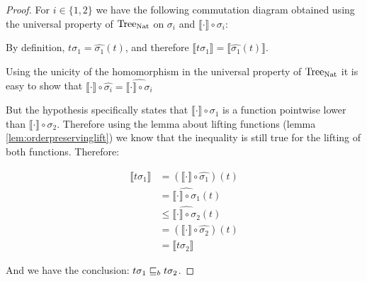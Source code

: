 \begin{ensps}
\begin{proof}
    For $i \in \{ 1, 2\}$ we have the following commutation diagram 
    obtained using the universal property of $\textnormal{Tree}_{\textnormal{Nat}}$ on 
    $\sigma_i$ and $\llbracket \cdot \rrbracket \circ \sigma_i$:

    \begin{center}
    \end{center}

    By definition, $t \sigma_1 = \hat{\sigma_1} (t)$, 
    and therefore $\llbracket t \sigma_1 \rrbracket = \llbracket \hat{\sigma_1}
    (t) \rrbracket$.

    Using the unicity of the homomorphism in the universal property of
    $\textnormal{Tree}_{\textnormal{Nat}}$ it is easy to show that $\llbracket \cdot \rrbracket 
    \circ \hat{\sigma_i} = \widehat{ \llbracket \cdot \rrbracket \circ \sigma_i
    }$

    But the hypothesis specifically states that $\llbracket \cdot \rrbracket 
    \circ \sigma_1$ is a function pointwise lower than $\llbracket \cdot
    \rrbracket \circ \sigma_2$. Therefore using the lemma about 
    lifting functions (lemma \ref{lem:orderpreservinglift})
    we know that the inequality is still true for the lifting 
    of both functions. Therefore:

    \begin{align*}
        \llbracket t \sigma_1 \rrbracket &= 
        (\llbracket \cdot \rrbracket \circ \hat{\sigma_1}) (t) \\
        &= \widehat{ \llbracket \cdot \rrbracket \circ \sigma_1} (t) \\
        &\leq \widehat{ \llbracket \cdot \rrbracket \circ \sigma_2} (t) \\
        &= 
        (\llbracket \cdot \rrbracket \circ \hat{\sigma_2}) (t) \\
        &= \llbracket t \sigma_2 \rrbracket
    \end{align*}
    
    And we have the conclusion: $t \sigma_1 \sqsubseteq_b t \sigma_2$.
\end{proof}
\end{ensps}

